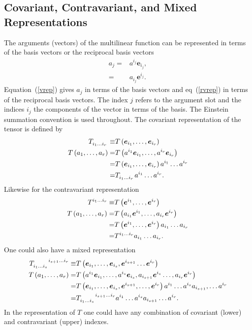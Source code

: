 \documentclass[12pt]{report}
\newcommand{\bm}[1]{\boldsymbol{#1}}
\newcommand{\lp}{\left (}
\newcommand{\rp}{\right )}
\newcommand{\f}[2]{{#1}\lp {#2} \rp}
\newcommand{\eb}{\bm{e}}
\begin{document}
\subsection{Covariant, Contravariant, and Mixed Representations}

The arguments (vectors) of the multilinear function can be represented in terms of the basis vectors or the reciprocal basis vectors
\begin{align}
    a_{j} =& a^{i_{j}}\eb_{i_{j}}, \label{vrep}\\
          =& a_{i_{j}}\eb^{i_{j}}. \label{rvrep}
\end{align}
Equation~(\ref{vrep}) gives $a_{j}$ in terms of the basis vectors and eq~(\ref{rvrep}) in terms of the reciprocal basis vectors. The index
$j$ refers to the argument slot and the indices $i_{j}$ the components of the vector in terms of the basis.  The Einstein summation
convention is used throughout.  The covariant representation of the tensor is defined by
\begin{align}
    T\indices{_{i_{1}\dots i_{r}}} \equiv& \f{T}{\eb_{i_{1}},\dots,\eb_{i_{r}}} \\
    \f{T}{a_{1},\dots,a_{r}} =& \f{T}{a^{i_{1}}\eb_{i_{1}},\dots,a^{i_{r}}\eb_{i_{r}}} \nonumber \\
                             =& \f{T}{\eb_{i_{1}},\dots,\eb_{i_{r}}}a^{i_{1}}\dots a^{i_{r}} \nonumber \\
                             =& T\indices{_{i_{1}\dots i_{r}}}a^{i_{1}}\dots a^{i_{r}}.
\end{align}
Likewise for the contravariant representation
\begin{align}
    T\indices{^{i_{1}\dots i_{r}}} \equiv& \f{T}{\eb^{i_{1}},\dots,\eb^{i_{r}}} \\
    \f{T}{a_{1},\dots,a_{r}} =& \f{T}{a_{i_{1}}\eb^{i_{1}},\dots,a_{i_{r}}\eb^{i_{r}}} \nonumber \\
                             =& \f{T}{\eb^{i_{1}},\dots,\eb^{i_{r}}}a_{i_{1}}\dots a_{i_{r}} \nonumber \\
                             =& T\indices{^{i_{1}\dots i_{r}}}a_{i_{1}}\dots a_{i_{r}}.
\end{align}
One could also have a mixed representation
\begin{align}
    T\indices{_{i_{1}\dots i_{s}}^{i_{s+1}\dots i_{r}}} \equiv& \f{T}{\eb_{i_{1}},\dots,\eb_{i_{s}},\eb^{i_{s+1}}\dots\eb^{i_{r}}} \\
    \f{T}{a_{1},\dots,a_{r}} =& \f{T}{a^{i_{1}}\eb_{i_{1}},\dots,a^{i_{s}}\eb_{i_{s}},
                                a_{i_{s+1}}\eb^{i_{s}}\dots,a_{i_{r}}\eb^{i_{r}}} \nonumber \\
                             =& \f{T}{\eb_{i_{1}},\dots,\eb_{i_{s}},\eb^{i_{s+1}},\dots,\eb^{i_{r}}}
                                a^{i_{1}}\dots a^{i_{s}}a_{i_{s+1}},\dots a^{i_{r}} \nonumber \\
                             =& T\indices{_{i_{1}\dots i_{s}}^{i_{s+1}\dots i_{r}}}a^{i_{1}}\dots a^{i_{s}}a_{i_{s+1}}\dots a^{i_{r}}.
\end{align}
In the representation of $T$ one could have any combination of covariant (lower) and contravariant (upper) indexes.
\end{document}
